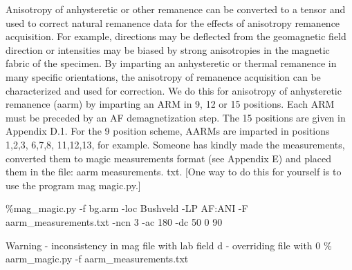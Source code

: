 \documentclass[draft,plain]{tauxe}
\begin{document}

Anisotropy of anhysteretic or other remanence can be converted to a tensor and used to correct
natural remanence data for the effects of anisotropy remanence acquisition. For example, directions
may be deflected from the geomagnetic field direction or intensities may be biased by strong anisotropies
in the magnetic fabric of the specimen. By imparting an anhysteretic or thermal remanence
in many specific orientations, the anisotropy of remanence acquisition can be characterized and
used for correction. We do this for anisotropy of anhysteretic remanence (aarm) by imparting an
ARM in 9, 12 or 15 positions. Each ARM must be preceded by an AF demagnetization step. The 15
positions are given in Appendix D.1. For the 9 position scheme, AARMs are imparted in positions
1,2,3, 6,7,8, 11,12,13, for example. Someone has kindly made the measurements, converted them
to magic measurements format (see Appendix E) and placed them in the file: aarm measurements.
txt. [One way to do this for yourself is to use the program mag magic.py.]

\begin{ulist}
\item[] \%mag\_magic.py -f bg.arm -loc Bushveld -LP AF:ANI -F aarm\_measurements.txt
-ncn 3 -ac 180 -dc 50 0 90
\item[] Warning - inconsistency in mag file with lab field d - overriding file with 0
\% aarm\_magic.py -f aarm\_measurements.txt
\end{ulist}
\end{document}
